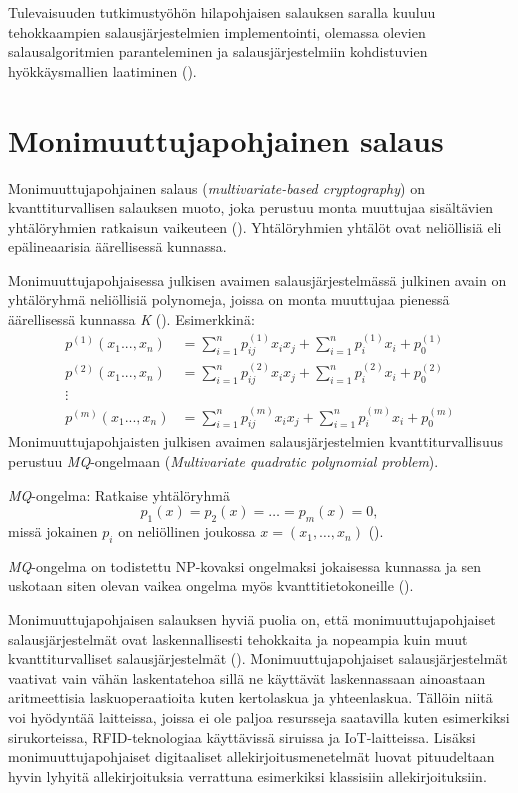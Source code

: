 Tulevaisuuden tutkimustyöhön hilapohjaisen salauksen saralla kuuluu tehokkaampien salausjärjestelmien implementointi, olemassa olevien salausalgoritmien paranteleminen ja salausjärjestelmiin kohdistuvien hyökkäysmallien laatiminen (\cite{8275352}).

\section{Monimuuttujapohjainen salaus}
Monimuuttujapohjainen salaus (\emph{multivariate-based cryptography}) on kvanttiturvallisen salauksen muoto, joka perustuu monta muuttujaa sisältävien yhtälöryhmien ratkaisun vaikeuteen (\cite{Ding2009}). Yhtälöryhmien yhtälöt ovat neliöllisiä eli epälineaarisia äärellisessä kunnassa.

Monimuuttujapohjaisessa julkisen avaimen salausjärjestelmässä julkinen avain on yhtälöryhmä neliöllisiä polynomeja, joissa on monta muuttujaa pienessä äärellisessä kunnassa \emph{K} (\cite{8012305}). Esimerkkinä: 
    \begin{align*}
        p^{(1)}(x_{1}...,x_{n}) &= \sum_{i=1}^{n} p_{ij}^{(1)}x_{i}x_ {j}+\sum_{i=1}^{n}p_ {i}^{(1)}x_{i}+p_ {0}^{(1)} \\
        p^{(2)}(x_{1}...,x_{n}) &= \sum_{i=1}^{n} p_{ij}^{(2)}x_{i}x_ {j}+\sum_{i=1}^{n}p_ {i}^{(2)}x_{i}+p_ {0}^{(2)} \\
        \vdots \\
        p^{(m)}(x_{1}...,x_{n}) &= \sum_{i=1}^{n} p_{ij}^{(m)}x_{i}x_ {j}+\sum_{i=1}^{n}p_ {i}^{(m)}x_{i}+p_ {0}^{(m)}
    \end{align*}
Monimuuttujapohjaisten julkisen avaimen salausjärjestelmien kvanttiturvallisuus perustuu \emph{MQ}-ongelmaan (\emph{Multivariate quadratic polynomial problem}).

\emph{MQ}-ongelma: Ratkaise yhtälöryhmä \[p_{1}(x) = p_{2}(x) = \ldots = p_ {m}(x) = 0,\] missä jokainen $p_{i}$ on neliöllinen joukossa $x = (x_{1}, \ldots, x_{n})$ (\cite{Ding2009}).

\emph{MQ}-ongelma on todistettu NP-kovaksi ongelmaksi jokaisessa kunnassa ja sen uskotaan siten olevan vaikea ongelma myös kvanttitietokoneille (\cite{8012305}).

Monimuuttujapohjaisen salauksen hyviä puolia on, että monimuuttujapohjaiset salausjärjestelmät ovat laskennallisesti tehokkaita ja nopeampia kuin muut kvanttiturvalliset salausjärjestelmät  (\cite{8012305}). Monimuuttujapohjaiset salausjärjestelmät vaativat vain vähän laskentatehoa sillä ne käyttävät laskennassaan ainoastaan aritmeettisia laskuoperaatioita kuten kertolaskua ja yhteenlaskua. Tällöin niitä voi hyödyntää laitteissa, joissa ei ole paljoa resursseja saatavilla kuten esimerkiksi sirukorteissa, RFID-teknologiaa käyttävissä siruissa ja IoT-laitteissa. Lisäksi monimuuttujapohjaiset digitaaliset allekirjoitusmenetelmät luovat pituudeltaan hyvin lyhyitä allekirjoituksia verrattuna esimerkiksi klassisiin allekirjoituksiin.

